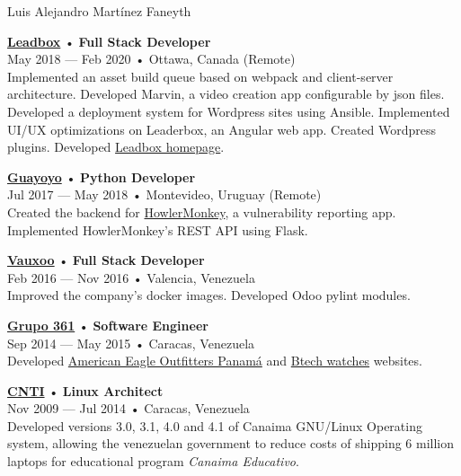 \documentclass[12pt]{article}
\begin{document}
\begin{cv}{Luis Alejandro Mart\'inez Faneyth}
\begin{minipage}[t]{0.55\textwidth}
{    }\vspace{0.125em}
    \parbox[t]{\linewidth}{
      \textbf{\href{http://leadboxhq.com}{Leadbox}} • \textrm{\textbf{Full Stack Developer}}\\
      May 2018 --- Feb 2020 • Ottawa, Canada (Remote)\\
      \footnotesize{Implemented an asset build queue based on webpack and client-server architecture. Developed Marvin, a video creation app configurable by json files. Developed a deployment system for Wordpress sites using Ansible. Implemented UI/UX optimizations on Leaderbox, an Angular web app. Created Wordpress plugins. Developed \href{https://leadboxhq.com}{Leadbox homepage}.}\\
    }\vspace{0.125em}
    \parbox[t]{\linewidth}{
      \textbf{\href{https://guayoyo.io}{Guayoyo}} • \textrm{\textbf{Python Developer}}\\
      Jul 2017 --- May 2018 • Montevideo, Uruguay (Remote)\\
      \footnotesize{Created the backend for \href{https://howlermonkey.io}{HowlerMonkey}, a vulnerability reporting app. Implemented HowlerMonkey's REST API using Flask.}\\
    }\vspace{0.125em}
    \parbox[t]{\linewidth}{
      \textbf{\href{https://www.vauxoo.com}{Vauxoo}} • \textrm{\textbf{Full Stack Developer}}\\
      Feb 2016 --- Nov 2016 • Valencia, Venezuela\\
      \footnotesize{Improved the company's docker images. Developed Odoo pylint modules.}\\
    }\vspace{0.125em}
    \parbox[t]{\linewidth}{
      \textbf{\href{https://web.archive.org/web/20180322024522/http://grupo361.com/}{Grupo 361}} • \textrm{\textbf{Software Engineer}}\\
      Sep 2014 --- May 2015 • Caracas, Venezuela\\
      \footnotesize{Developed \href{https://web.archive.org/web/20180322024522/http://grupo361.com/}{American Eagle Outfitters Panamá} and \href{https://web.archive.org/web/20180322024522/http://grupo361.com/}{Btech watches} websites.}\\
    }\vspace{0.125em}
    \parbox[t]{\linewidth}{
      \textbf{\href{https://www.cnti.gob.ve}{CNTI}} • \textrm{\textbf{Linux Architect}}\\
      Nov 2009 --- Jul 2014 • Caracas, Venezuela\\
      \footnotesize{Developed versions 3.0, 3.1, 4.0 and 4.1 of Canaima GNU/Linux Operating system, allowing the venezuelan government to reduce costs of shipping 6 million laptops for educational program \textsl{Canaima Educativo}.}\\
    }
  \end{minipage}

\end{cv}
\end{document}
